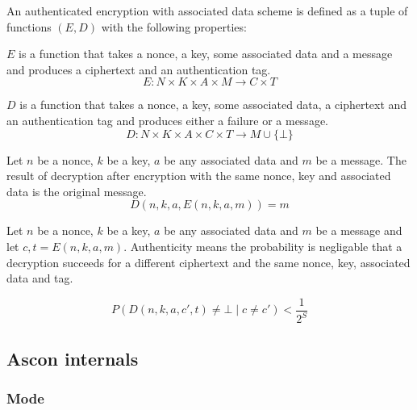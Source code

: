 An authenticated encryption with associated data scheme is defined as a tuple of
functions $(E, D)$ with the following properties:

$E$ is a function that takes a nonce, a key, some associated data and a message
and produces a ciphertext and an authentication tag.
\begin{equation}
    E \colon N \times K \times A \times M \to C \times T
\end{equation}

$D$ is a function that takes a nonce, a key, some associated data, a ciphertext
and an authentication tag and produces either a failure or a message.
\begin{equation}
    D \colon N \times K \times A \times C \times T \to M \cup \{ \bot \}
\end{equation}

Let $n$ be a nonce, $k$ be a key, $a$ be any associated data and $m$ be a
message. The result of decryption after encryption with the same nonce, key and
associated data is the original message.
\begin{equation}
    D(n, k, a, E(n, k, a, m)) = m
\end{equation}


Let $n$ be a nonce, $k$ be a key, $a$ be any associated data and $m$ be a
message and let $c, t = E(n, k, a, m)$. Authenticity means the probability is
negligable that a decryption succeeds for a different ciphertext and the same
nonce, key, associated data and tag.

\begin{equation}
    P(D(n, k, a, c', t) \neq \bot \mid c \neq c') < \frac{1}{2^S}
\end{equation}

\subsection{Ascon internals}

\subsubsection{Mode}

